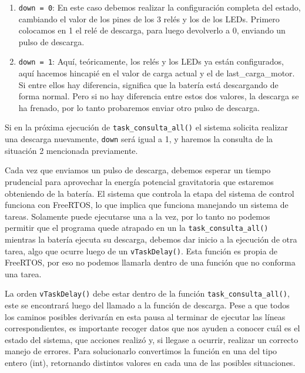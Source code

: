 \begin{itemize} [label = ·]
                        \begin{enumerate}
                            \item \texttt{down = 0}: En este caso debemos realizar la configuración completa del estado, cambiando el valor de los pines de los 3 relés y los de los LEDs. Primero colocamos en 1 el relé de descarga, para luego devolverlo a 0, enviando un pulso de descarga.
                            \item \texttt{down = 1}: Aquí, teóricamente, los relés y los LEDs ya están configurados, aquí hacemos hincapié en el valor de carga actual y el de last\_carga\_motor. Si entre ellos hay diferencia, significa que la batería está descargando de forma normal. Pero si no hay diferencia entre estos dos valores, la descarga se ha frenado, por lo tanto probaremos enviar otro pulso de descarga.\par
                        \end{enumerate}
                        
                        Si en la próxima ejecución de \texttt{task\_consulta\_all()} el sistema solicita realizar una descarga nuevamente, \texttt{down} será igual a 1, y haremos la consulta de la situación 2 mencionada previamente.\par
                        Cada vez que enviamos un pulso de descarga, debemos esperar un tiempo prudencial para aprovechar la energía potencial gravitatoria que estaremos obteniendo de la batería. El sistema que controla la etapa del sistema de control funciona con FreeRTOS, lo que implica que funciona manejando un sistema de tareas. Solamente puede ejecutarse una a la vez, por lo tanto no podemos permitir que el programa quede atrapado en un la \texttt{task\_consulta\_all()} mientras la batería ejecuta su descarga, debemos dar inicio a la ejecución de otra tarea, algo que ocurre luego de un \texttt{vTaskDelay()}. Esta función es propia de FreeRTOS, por eso no podemos llamarla dentro de una función que no conforma una tarea.\par
                        La orden \texttt{vTaskDelay()} debe estar dentro de la función \texttt{task\_consulta\_all()}, este se encontrará luego del llamado a la función de descarga. Pese a que todos los caminos posibles derivarán en esta pausa al terminar de ejecutar las líneas correspondientes, es importante recoger datos que nos ayuden a conocer cuál es el estado del sistema, que acciones realizó y, si llegase a ocurrir, realizar un correcto manejo de errores.
                        Para solucionarlo convertimos la función en una del tipo entero (int), retornando distintos valores en cada una de las posibles situaciones.\par
                        

\end{itemize}

